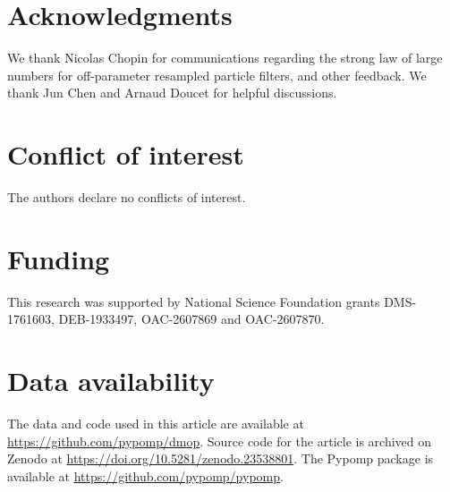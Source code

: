 \documentclass[numsec,webpdf,modern,medium,namedate]{oup-authoring-template}
\begin{document}
\begingroup\renewcommand{\kevin}[1]{#1}\renewcommand{\sout}[1]{}
\section*{Acknowledgments}
\sout{This research was supported by National Science Foundation grants DMS-1761603, DEB-1933497 and OAC-2607869.}
We thank Nicolas Chopin for communications regarding the strong law of large numbers for off-parameter resampled particle filters, and other feedback. We thank Jun Chen and Arnaud Doucet for helpful discussions.
{\editAIstatement}

\section*{Conflict of interest}
\kevin{The authors declare no conflicts of interest.}

\section*{Funding}
\kevin{This research was supported by National Science Foundation grants DMS-1761603, DEB-1933497, OAC-2607869 and OAC-2607870.}

\section*{Data availability}
\kevin{The data and code used in this article are available at \url{https://github.com/pypomp/dmop}. Source code for the article is archived on Zenodo at \url{https://doi.org/10.5281/zenodo.23538801}. The Pypomp package is available at \url{https://github.com/pypomp/pypomp}.}
\endgroup

%


\end{document}

